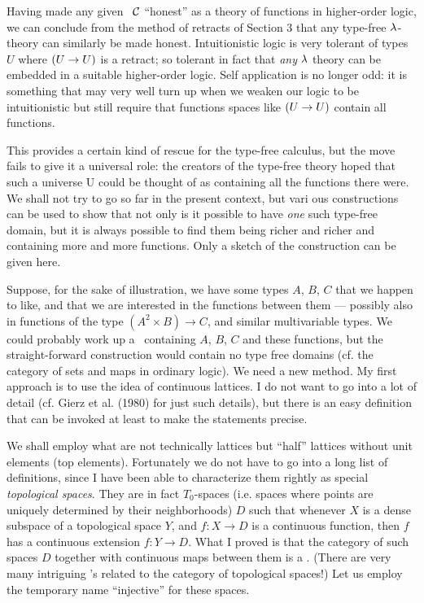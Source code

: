 Having made any given \ccc\ $\mathcal C$ ``honest'' as a theory of functions in higher-order logic, we can conclude from the method of retracts of Section 3 that any type-free $\lambda$-theory can similarly be made honest. Intuitionistic logic is very tolerant of types $U$ where $(U\rightarrow U)$ is a retract; so tolerant in fact that {\it any} $\lambda$ theory can be embedded in a suitable higher-order logic. Self application is no longer odd: it is something that may very well turn up when we weaken our logic to be intuitionistic but still require that functions spaces like $(U\rightarrow U)$ contain all functions.

This provides a certain kind of rescue for the type-free calculus, but the move fails to give it a universal role: the creators of the type-free theory hoped that such a universe U could be thought of as containing all the functions there were. We shall not try to go so far in the present context, but vari ous constructions can be used to show that not only is it possible to have {\it one} such type-free domain, but it is always possible to find them being richer and richer and containing more and more functions. Only a sketch of the construction can be given here.

Suppose, for the sake of illustration, we have some types $A$, $B$, $C$ that we happen to like, and that we are interested in the
functions between them --- possibly also in functions of the type $(A^2 \times B) \to C$, and similar multivariable types. We could probably work up a \ccc\  containing $A$, $B$, $C$ and these functions, but the straight-forward construction would contain no type free domains (cf. the category of sets and maps in ordinary logic). We need a new method. My first approach is to use the idea of continuous lattices. I do not want to go into a lot of detail (cf. Gierz et al. (1980) for just such details), but there is an easy definition that can be invoked at least to make the statements precise.

We shall employ what are not technically lattices but ``half'' lattices without unit elements (top elements). Fortunately we do not have to go into a long list of definitions, since I have been able to characterize them rightly as special {\it topological spaces}. They are in fact $T_0$-spaces (i.e. spaces where points are uniquely determined by their neighborhoods) $D$ such that whenever $X$ is a dense subspace of a topological space $Y$, and $f : X\to D$ is a continuous function, then $f$ has a continuous extension $f:Y\to D$. What I proved is that the category of such spaces $D$ together with continuous maps between them is a \ccc . (There are very many intriguing \ccc's related to the category of topological spaces!) Let us employ the temporary name ``injective'' for these spaces.

